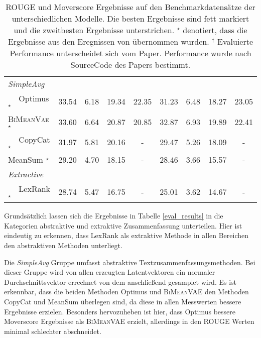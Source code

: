 \begin{table}[!h]
\begin{tabular}{@{}lcccccccc@{}}
    \textit{SimpleAvg}         &         &         &        &      &  &        &        \\
    $\quad$ Optimus  $^{\star}$          & 33.54   & 6.18    & 19.34 & 22.35& 31.23  & 6.48   & 18.27 & 23.05\\
    $\quad$ \textsc{BiMeanVae}$^{\star}$ & 33.60   & 6.64    & 20.87 & 20.85& 32.87  & 6.93   & 19.89 & 22.41\\
    $\quad$ CopyCat  $^{\star}$          & 31.97   & 5.81    & 20.16 &- & 29.47  & 5.26   & 18.09 & -\\ 
    $\quad$ MeanSum  $^{\star}$          & 29.20   & 4.70    & 18.15 & -& 28.46  & 3.66   & 15.57 & -\\ \midrule
    \textit{Extractive}        &         &         &        &      &  &        &  &      \\
    $\quad$ LexRank  $^{\star}$          & 28.74   & 5.47    & 16.75 & -& 25.01  & 3.62   & 14.67 & -\\ \bottomrule
    \end{tabular}
    \caption{ROUGE und Moverscore Ergebnisse auf den Benchmarkdatensätze der unterschiedlichen Modelle. Die besten Ergebnisse sind fett markiert und die zweitbesten Ergebnisse unterstrichen.
    $^{\star}$ denotiert, dass die Ergebnisse aus den Eregnissen von \citep{coop} übernommen wurden.
    $^{\dagger}$ Evaluierte Performance unterscheidet sich vom \citep{coop} Paper. Performance wurde nach SourceCode des Papers bestimmt.
    }
\end{table}

Grundsätzlich lassen sich die Ergebnisse in Tabelle \ref{eval_results} in die Kategorien abstraktive und extraktive Zusammenfassung unterteilen.
Hier ist eindeutig zu erkennen, dass LexRank als extraktive Methode in allen Bereichen den abstraktiven Methoden unterliegt.

Die \textit{SimpleAvg} Gruppe umfasst abstraktive Textzusammenfassungsmethoden. 
Bei dieser Gruppe wird von allen erzeugten Latentvektoren ein normaler Durchschnittsvektor errechnet von dem anschließend gesamplet wird.
Es ist erkennbar, dass die beiden Methoden Optimus und \textsc{BiMeanVAE} den Methoden CopyCat und MeanSum überlegen sind, da diese in allen Messwerten bessere Ergebnisse erzielen.
Besonders hervozuheben ist hier, dass Optimus bessere Moverscore Ergebnisse als \textsc{BiMeanVAE} erzielt, allerdings in den ROUGE Werten minimal schlechter abschneidet.

